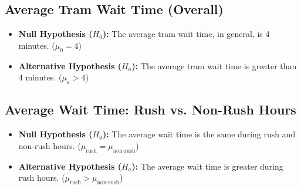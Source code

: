 \documentclass[a4paper, 10pt]{article}
\begin{document}
		\subsection{Average Tram Wait Time (Overall)}
			\begin{itemize}
					\item \textbf{Null Hypothesis ($H_0$):} The average tram wait time, in general, is 4 minutes. ($\mu_0 = 4$)
					\item \textbf{Alternative Hypothesis ($H_a$):} The average tram wait time is greater than 4 minutes. ($\mu_a > 4$)
			\end{itemize}

		\subsection{Average Wait Time: Rush vs. Non-Rush Hours}
			\begin{itemize}
					\item \textbf{Null Hypothesis ($H_0$):} The average wait time is the same during rush and non-rush hours. ($\mu_{\text{rush}} = \mu_{\text{non-rush}}$)
					\item \textbf{Alternative Hypothesis ($H_a$):} The average wait time is greater during rush hours. ($\mu_{\text{rush}} > \mu_{\text{non-rush}}$)
			\end{itemize}
\end{document}
